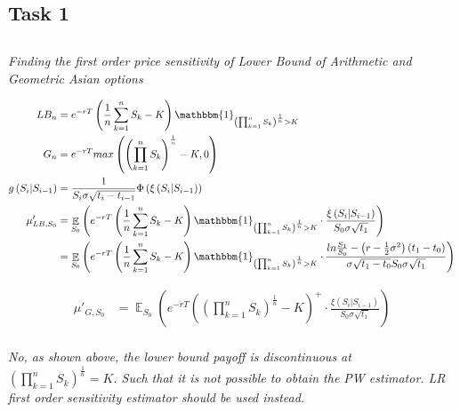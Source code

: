 \documentclass[10pt,oneside,a4paper]{article}
\DeclareMathOperator{\E}{\mathbb{E}}
\begin{document}
\begin{flushleft}


\section{Task 1}
\subsection{}
\textsl{Finding the first order price sensitivity of Lower Bound of Arithmetic and Geometric Asian options}

\begin{align*}
LB_n &= e^{-rT}\left( \frac{1}{n}\sum_{k=1}^{n}S_k - K\right) \mathbbm{1}_{\left( \prod_{k=1}^{n}S_k\right) ^{\frac{1}{n}} >K}\\
G_n &= e^{-rT} max \left(\left(\prod_{k=1}^{n}S_k\right) ^{\frac{1}{n}} - K, 0 \right)\\
g\left(S_i|S_{i-1}\right) &= \frac{1}{S_i \sigma\sqrt{t_i - t_{i-1}}}\Phi\left(\xi\left(S_i|S_{i-1}\right)\right)\\
\mu'_{LB, S_0} &= \E _{S_0}\left(e^{-rT}\left( \frac{1}{n}\sum_{k=1}^{n}S_k - K\right)\mathbbm{1}_{\left( \prod_{k=1}^{n}S_k\right) ^{\frac{1}{n} }>K} \cdot \frac{\xi\left(S_i|S_{i-1}\right)}{S_0 \sigma \sqrt{t_1}} \right)\\
&= \E _{S_0}\left(e^{-rT}\left( \frac{1}{n}\sum_{k=1}^{n}S_k - K\right)\mathbbm{1}_{\left( \prod_{k=1}^{n}S_k\right) ^{\frac{1}{n} }>K} \cdot \frac{ln\frac{S_1}{S_0} - \left(r - \frac{1}{2}\sigma^2\right)\left(t_1 - t_0\right)}{\sigma\sqrt{t_1 - t_0}S_0\sigma\sqrt{t_1}}\right)
\end{align*}

\vspace{5mm}

\begin{align*}
\mu'_{G, S_0} &= \E _{S_0}\left(e^{-rT}\left(\left(\prod_{k=1}^{n}S_k\right) ^{\frac{1}{n}} - K\right)^{+} \cdot \frac{\xi\left(S_i|S_{i-1}\right)}{S_0 \sigma \sqrt{t_1}} \right)\\
\end{align*}

\textsl{No, as shown above, the lower bound payoff is discontinuous at $\left( \prod_{k=1}^{n}S_k\right) ^{\frac{1}{n}} =K$. Such that it is not possible to obtain the PW estimator. LR first order sensitivity estimator should be used instead.}

\subsection{}


\end{flushleft}
\end{document}
